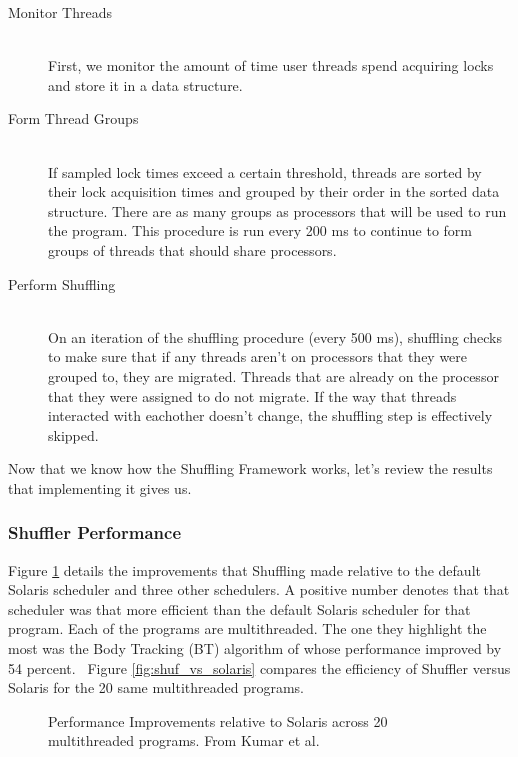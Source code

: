 \documentclass{sig-alternate}
\begin{document}
\begin{description}
\item [Monitor Threads] \ \\
First, we monitor the amount of time user threads spend acquiring locks and store it in a data structure. 

\item [Form Thread Groups] \ \\
If sampled lock times exceed a certain threshold, threads are sorted by their lock acquisition times and grouped by their order in the sorted data structure. There are as many groups as processors that will be used to run the program. This procedure is run every 200 ms to continue to form groups of threads that should share processors.

\item [Perform Shuffling] \ \\
On an iteration of the shuffling procedure (every 500 ms), shuffling checks to make sure that if any threads aren't on processors that they were grouped to, they are migrated. Threads that are already on the processor that they were assigned to do not migrate. If the way that threads interacted with eachother doesn't change, the shuffling step is effectively skipped.~\cite{KumarEtal:2014}
\end{description}

Now that we know how the Shuffling Framework works, let's review the results that implementing it gives us.

\subsubsection{Shuffler Performance}
\label{sec:shuf_performance}

Figure \ref{fig:shuf_performance} details the improvements that Shuffling made relative to the default Solaris scheduler and three other schedulers. A positive number denotes that that scheduler was that more efficient than the default Solaris scheduler for that program. Each of the programs are multithreaded. The one they highlight the most was the Body Tracking (BT) algorithm of whose performance improved by 54 percent.~\cite{KumarEtal:2014} Figure \ref{fig:shuf_vs_solaris} compares the efficiency of Shuffler versus Solaris for the 20 same multithreaded programs.
\begin{figure}
\centering
{}
\caption{Performance Improvements relative to Solaris across 20 multithreaded programs. From Kumar et al.~\cite{KumarEtal:2014}}
\label{fig:shuf_performance}
\end{figure}
\end{document}
